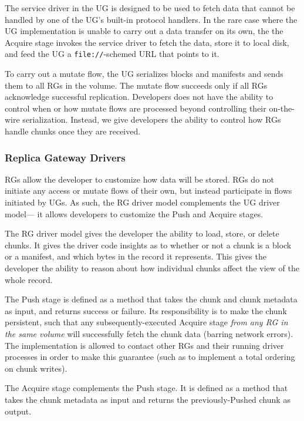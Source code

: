   The service driver in the UG is designed to
be used to fetch data that cannot be handled by one of the UG's built-in
protocol handlers.  In the rare case where the UG implementation is unable to carry out
a data transfer on its own, the the Acquire stage 
invokes the service driver to fetch the data, store it to local disk, and feed the UG a
\texttt{file://}-schemed URL that points to it.

To carry out a mutate flow, the UG serializes blocks and manifests and sends them to all RGs
in the volume.  The mutate flow succeeds only if all RGs
acknowledge successful replication.  Developers does not have the ability to
control when or how mutate flows are processed beyond controlling their
on-the-wire serialization.  Instead, we give developers the
ability to control how RGs handle chunks once they are received.

\subsubsection{Replica Gateway Drivers}

RGs allow the developer to customize how data will be stored.  RGs do not
initiate any access or mutate flows of their own, but instead participate in
flows initiated by UGs.  As such, the RG driver model complements the UG driver model---
it allows developers to customize the Push and Acquire stages.

  The RG driver model gives the developer
the ability to load, store, or delete chunks.  It gives the driver code insights
as to whether or not a chunk is a block or a manifest, and which bytes in the
record it represents.  This gives the developer the ability to reason about how
individual chunks affect the view of the whole record.

The Push stage is defined as a method that takes the chunk and chunk metadata as
input, and returns success or failure.  Its responsibility is to make the chunk
persistent, such that any subsequently-executed Acquire stage \textit{from any
RG in the same volume} will successfully fetch the chunk data (barring network
errors).  The implementation is allowed to contact other RGs and their running
driver processes in order to make this guarantee (such as to implement a total
ordering on chunk writes).

The Acquire stage complements the Push stage.  It is defined as a method that
takes the chunk metadata as input and returns the previously-Pushed chunk as
output.

